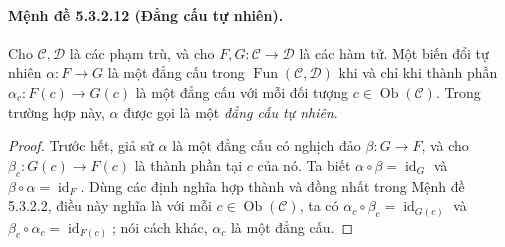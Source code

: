 \paragraph{Mệnh đề 5.3.2.12 (Đẳng cấu tự nhiên).} Cho $\mathcal C,\mathcal D$ là các phạm trù, và cho $F,G:\mathcal C\to\mathcal D$ là các hàm tử. Một biến đổi tự nhiên $\alpha:F\to G$ là một đẳng cấu trong $\operatorname{Fun}(\mathcal C,\mathcal D)$ khi và chỉ khi thành phần $\alpha_c:F(c)\to G(c)$ là một đẳng cấu với mỗi đối tượng $c\in\operatorname{Ob}(\mathcal C)$. Trong trường hợp này, $\alpha$ được gọi là một \emph{đẳng cấu tự nhiên}.
\begin{proof}Trước hết, giả sử $\alpha$ là một đẳng cấu có nghịch đảo $\beta:G\to F$, và cho $\beta_c:G(c)\to F(c)$ là thành phần tại $c$ của nó. Ta biết $\alpha\circ\beta=\operatorname{id}_G$ và $\beta\circ\alpha=\operatorname{id}_F$. Dùng các định nghĩa hợp thành và đồng nhất trong Mệnh đề 5.3.2.2, điều này nghĩa là với mỗi $c\in\operatorname{Ob}(\mathcal C)$, ta có $\alpha_c\circ\beta_c=\operatorname{id}_{G(c)}$ và $\beta_c\circ\alpha_c=\operatorname{id}_{F(c)}$; nói cách khác, $\alpha_c$ là một đẳng cấu.


\end{proof}
